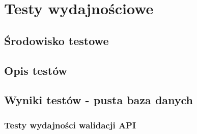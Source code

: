 \chapter{Testy wydajnościowe}
\section{Środowisko testowe}
\section{Opis testów}
\section{Wyniki testów - pusta baza danych}

\newpage
\subsection{Testy wydajności walidacji API}
% 
% 

% 
% 

% 
% 

% 
% 

% 
% 

